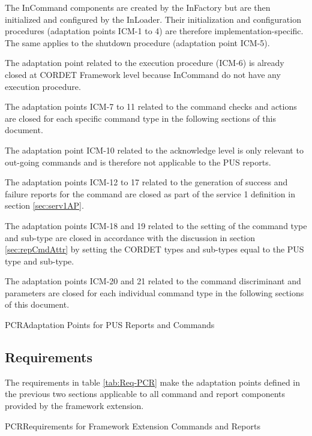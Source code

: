 \documentclass[a4paper,10pt]{article}
\newenvironment{fw_itemize}						%
{\begin{itemize}
  \setlength{\itemsep}{1mm}
  \setlength{\parskip}{0pt}
  \setlength{\parsep}{0pt}}
{\end{itemize}}
\newenvironment{cr_req}[2]
{
\begin{longtable}{|l|p{11.8cm}|}
\caption{#2}\label{tab:Req-#1} \\
\hline
\rowcolor{light-gray}
\textbf{Req. ID} & \textbf{Requirement Text}\\
\hline\hline
\endfirsthead
\rowcolor{light-gray}
\textbf{Req. ID} & \textbf{Requirement Text}\\
\hline\hline
\endhead
\DTLforeach*[\DTLiseq{\cat}{#1}]{dbReq}{\cat=Category,\type=Type,\id=Id,\reqText=Text}
{\DTLiffirstrow{}{\\\hline}P-\cat-\id/\type & \textit{\reqText}}\\\hline
}
{\end{longtable}}
\newenvironment{cr_ap}[2]
{
\begin{longtable}{|l|p{4.7cm}|p{6.9cm}|}
\caption{#2}\label{tab:AP-#1} \\
\hline
\rowcolor{light-gray}
\textbf{AP ID} & \textbf{Adaptation Point} & \textbf{Default Value}\\
\hline\hline
\endfirsthead
\rowcolor{light-gray}
\textbf{AP ID} & \textbf{Adaptation Point} & \textbf{Default Value}\\
\hline\hline
\endhead
\DTLforeach*[\DTLiseq{\cat}{#1}]{dbAP}{\cat=Category,\origin=Origin,\id=Id,\ap=AP,\defValue=DefValue}
{\DTLiffirstrow{}{\\\hline}P-\cat-\id & \ap\ (\origin) & \defValue}\\\hline
}
{\end{longtable}}
\begin{document}
\begin{fw_itemize}
\item The InCommand components are created by the InFactory but are then initialized and configured by the InLoader. Their initialization and configuration procedures (adaptation points ICM-1 to 4) are therefore implementation-specific. The same applies to the shutdown procedure (adaptation point ICM-5).
\item The adaptation point related to the execution procedure (ICM-6) is already closed at CORDET Framework level because InCommand do not have any execution procedure.
\item The adaptation points ICM-7 to 11 related to the command checks and actions are closed for each specific command type in the following sections of this document.
\item The adaptation point ICM-10 related to the acknowledge level is only relevant to out-going commands and is therefore not applicable to the PUS reports.
\item The adaptation points ICM-12 to 17 related to the generation of success and failure reports for the command are closed as part of the service 1 definition in section \ref{sec:serv1AP}.
\item The adaptation points ICM-18 and 19 related to the setting of the command type and sub-type are closed in accordance with the discussion in section \ref{sec:repCmdAttr} by setting the CORDET types and sub-types equal to the PUS type and sub-type.
\item The adaptation points ICM-20 and 21 related to the command discriminant and parameters are closed for each individual command type in the following sections of this document.
\end{fw_itemize}

\begin{cr_ap}{PCR}{Adaptation Points for PUS Reports and Commands}
\end{cr_ap}

\subsection{Requirements}\label{sec:repCmdReq}
The requirements in table \ref{tab:Req-PCR} make the adaptation points defined in the previous two sections applicable to all command and report components provided by the framework extension.

\begin{cr_req}{PCR}{Requirements for Framework Extension Commands and Reports}
\end{cr_req}
\end{document}
